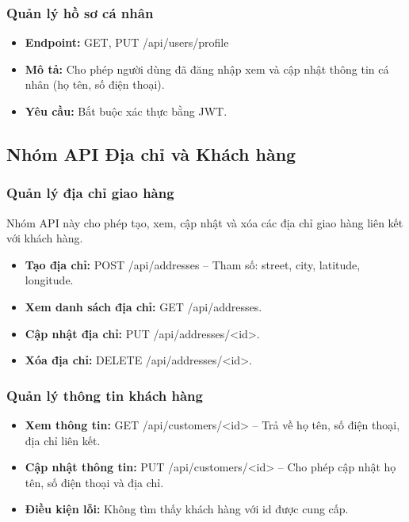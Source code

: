 \subsubsection{Quản lý hồ sơ cá nhân}

\begin{itemize}
\item
  \textbf{Endpoint:} GET, PUT /api/users/profile
\item
  \textbf{Mô tả:} Cho phép người dùng đã đăng nhập xem và cập nhật thông tin cá nhân (họ tên, số điện thoại).
\item
  \textbf{Yêu cầu:} Bắt buộc xác thực bằng JWT.
\end{itemize}

\subsection{Nhóm API Địa chỉ và Khách hàng}

\subsubsection{Quản lý địa chỉ giao hàng}

Nhóm API này cho phép tạo, xem, cập nhật và xóa các địa chỉ giao hàng liên kết với khách hàng.

\begin{itemize}
\item
  \textbf{Tạo địa chỉ:} POST /api/addresses -- Tham số: street, city, latitude, longitude.
\item
  \textbf{Xem danh sách địa chỉ:} GET /api/addresses.
\item
  \textbf{Cập nhật địa chỉ:} PUT /api/addresses/<id>.
\item
  \textbf{Xóa địa chỉ:} DELETE /api/addresses/<id>.
\end{itemize}

\subsubsection{Quản lý thông tin khách hàng}

\begin{itemize}
\item
  \textbf{Xem thông tin:} GET /api/customers/<id> -- Trả về họ tên, số điện thoại, địa chỉ liên kết.
\item
  \textbf{Cập nhật thông tin:} PUT /api/customers/<id> -- Cho phép cập nhật họ tên, số điện thoại và địa chỉ.
\item
  \textbf{Điều kiện lỗi:} Không tìm thấy khách hàng với id được cung cấp.
\end{itemize}

